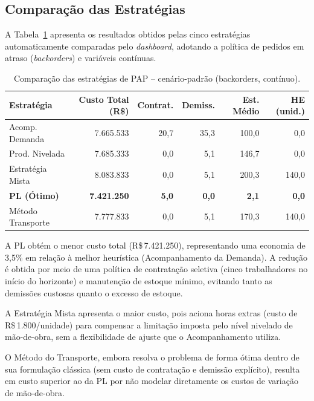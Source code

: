 \documentclass[a4paper,11pt]{article}
\begin{document}
\subsection{Comparação das Estratégias}

A Tabela~\ref{tab:comparacao} apresenta os resultados obtidos pelas cinco estratégias automaticamente comparadas pelo \textit{dashboard}, adotando a política de pedidos em atraso (\textit{backorders}) e variáveis contínuas.

\begin{table}[htbp]
\centering
\caption{Comparação das estratégias de PAP -- cenário-padrão (backorders, contínuo).}
\label{tab:comparacao}
\begin{tabularx}{\textwidth}{@{}Xrrrrr@{}}
\toprule
\textbf{Estratégia} &
\textbf{Custo Total (R\$)} &
\textbf{Contrat.} &
\textbf{Demiss.} &
\textbf{Est. Médio} &
\textbf{HE (unid.)} \\
\midrule
Acomp. Demanda   & 7.665.533 & 20,7 & 35,3 & 100,0 & 0,0 \\
Prod. Nivelada   & 7.685.333 &  0,0 &  5,1 & 146,7 & 0,0 \\
Estratégia Mista & 8.083.833 &  0,0 &  5,1 & 200,3 & 140,0 \\
\textbf{PL (Ótimo)} & \textbf{7.421.250} & \textbf{5,0} & \textbf{0,0} & \textbf{2,1} & \textbf{0,0} \\
Método Transporte & 7.777.833 & 0,0 &  5,1 & 170,3 & 140,0 \\
\bottomrule
\end{tabularx}
\end{table}

A PL obtém o menor custo total (R\$\,7.421.250), representando uma economia de 3,5\% em
relação à melhor heurística (Acompanhamento da Demanda). A redução é obtida por meio de
uma política de contratação seletiva (cinco trabalhadores no início do horizonte) e
manutenção de estoque mínimo, evitando tanto as demissões custosas quanto o excesso de
estoque.

A Estratégia Mista apresenta o maior custo, pois aciona horas extras (custo de
R\$\,1.800/unidade) para compensar a limitação imposta pelo nível nivelado de
mão-de-obra, sem a flexibilidade de ajuste que o Acompanhamento utiliza.

O Método do Transporte, embora resolva o problema de forma ótima dentro de sua
formulação clássica (sem custo de contratação e demissão explícito), resulta em custo
superior ao da PL por não modelar diretamente os custos de variação de mão-de-obra.
\end{document}

